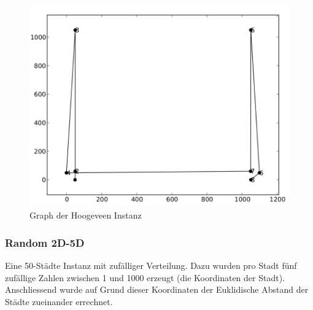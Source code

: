 \documentclass[11pt,a4paper]{article}
\begin{document}
\begin{figure}[H]
        \centering
        \includegraphics[width=14cm]{gfx/hoogeveen_algorithm}
        \caption{Graph der Hoogeveen Instanz}
        \label{img:hoogeveen_algorithm}
\end{figure}

\subsubsection{Random 2D-5D}
Eine 50-Städte Instanz mit zufälliger Verteilung. Dazu wurden pro Stadt fünf zufällige Zahlen zwischen 1 und 1000 erzeugt (die Koordinaten der Stadt). Anschliessend wurde auf Grund dieser Koordinaten der Euklidische Abstand der Städte zueinander errechnet.
\end{document}

